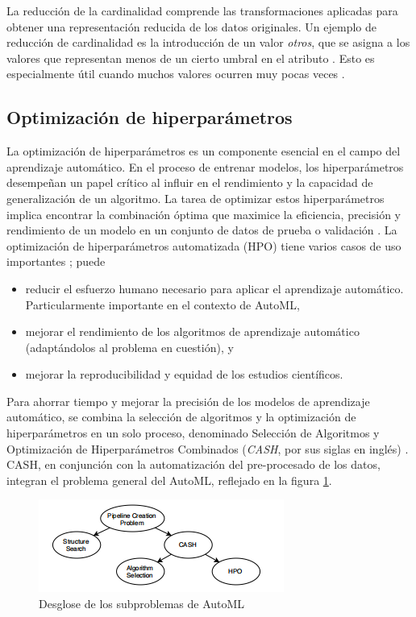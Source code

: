  La reducción de la cardinalidad comprende las transformaciones aplicadas para obtener una representación reducida de los datos originales. Un ejemplo de reducción de cardinalidad es la introducción de un valor \textit{otros}, que se asigna a los valores que representan menos de un cierto umbral en el atributo \citep{casas2019data}. Esto es especialmente útil cuando muchos valores ocurren muy pocas veces \citep{ventevogel2020construction}.


\subsection{Optimización de hiperparámetros}
La optimización de hiperparámetros es un componente esencial en el campo del aprendizaje automático. En el proceso de entrenar modelos, los hiperparámetros desempeñan un papel crítico al influir en el rendimiento y la capacidad de generalización de un algoritmo. La tarea de optimizar estos hiperparámetros implica encontrar la combinación óptima que maximice la eficiencia, precisión y rendimiento de un modelo en un conjunto de datos de prueba o validación  \citep{hastie2009elements}. La optimización de hiperparámetros automatizada (HPO) tiene varios casos de uso importantes  \citep{hutter2019automated}; puede
\begin{itemize}
	\item reducir el esfuerzo humano necesario para aplicar el aprendizaje automático. Particularmente importante en el contexto de AutoML,
	\item mejorar el rendimiento de los algoritmos de aprendizaje automático (adaptándolos al problema en cuestión), y
	\item mejorar la reproducibilidad y equidad de los estudios científicos.
\end{itemize}
Para ahorrar tiempo y mejorar la precisión de los modelos de aprendizaje automático, se combina la selección de algoritmos y la optimización de hiperparámetros en un solo proceso, denominado Selección de Algoritmos y Optimización de Hiperparámetros Combinados (\textit{CASH}, por sus siglas en inglés) \citep{tuggener2019automated}. \\
CASH, en conjunción con la automatización del pre-procesado de los datos, integran el problema general del AutoML, reflejado en la figura \ref{fig:desglose-de-los-subproblemas-de-automl}. 
\begin{figure}[H]
	\centering
	\includegraphics[width=0.6\linewidth]{"figuras/capi 1/Desglose de los subproblemas de AutoML"}
	\caption{Desglose de los subproblemas de AutoML \citep{zoller2021benchmark}}
	\label{fig:desglose-de-los-subproblemas-de-automl}
\end{figure} 
